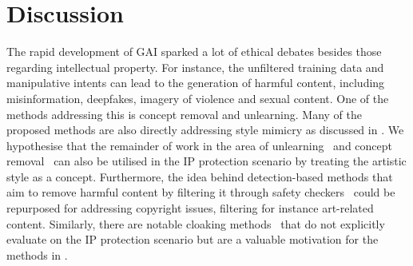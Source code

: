 \documentclass[conference]{IEEEtran}
\begin{document}





\section{Discussion}\label{sec:discussion}
The rapid development of GAI sparked a lot of ethical debates besides those regarding intellectual property. 
For instance, the unfiltered training data and manipulative intents can lead to the generation of harmful content, including misinformation, deepfakes, imagery of violence and sexual content. 
One of the methods addressing this is concept removal and unlearning. 
Many of the proposed methods are also directly addressing style mimicry as discussed in . 
We hypothesise that the remainder of work in the area of unlearning~\cite{wu_erasediff_2024} and concept removal~\cite{schramowski_safe_2023,tsai_ring--bell_2023,liu_geom-erasing_2023,ho_classifier-free_2022} can also be utilised in the IP protection scenario by treating the artistic style as a concept. 
Furthermore, the idea behind detection-based methods that aim to remove harmful content by filtering it through safety checkers~\cite{rando_red-teaming_2022} could be repurposed for addressing copyright issues, filtering for instance art-related content.
Similarly, there are notable cloaking methods~\cite{shan_fawkes_2020} that do not explicitly evaluate on the IP protection scenario but are a valuable motivation for the methods in .
\end{document}
